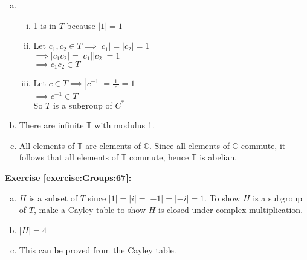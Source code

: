 \begin{enumerate}[(a)]
\item
	\begin{enumerate}[(i)]
	\item
	1 is in $T$ because $|1|=1$
	
	\item
	Let $c_1,c_2\in T\implies |c_1|=|c_2|=1$\\
	$\implies |c_1c_2|=|c_1||c_2|=1$\\
	$\implies c_1c_2\in T$
	
	\item
	Let $c\in T \implies |c^{-1}|=\displaystyle\frac{1}{|c|}=1$\\
	$\implies c^{-1}\in T$\\
	So $T$ is a subgroup of $C^*$
	\end{enumerate}
	
\item
There are infinite $\mathbb{ T}$ with modulus 1.

\item
All elements of ${\mathbb T}$  are elements of ${\mathbb C}$.  Since all elements of ${\mathbb C}$ commute, it follows that all elements of ${\mathbb T}$ commute, hence ${\mathbb T}$ is abelian.\\
\end{enumerate}

\noindent\textbf{Exercise \ref{exercise:Groups:67}:}
\begin{enumerate}[(a)]
\item
$H$ is a subset of $T$ since $|1|=|i|=|-1|=|-i|=1$. To show $H$ is a subgroup of $T$, make
a Cayley table to show $H$ is closed under complex multiplication. 

\item  
$|H|=4$

\item
This can be proved from the Cayley table.
\end{enumerate}

